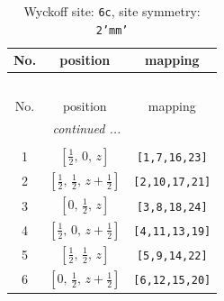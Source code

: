 \documentclass[fleqn,8pt]{jsarticle}
\begin{document}
\renewcommand{\arraystretch}{1.2}
\begin{longtable}{ccc}
\caption{Wyckoff site: {\tt 6c}, site symmetry: {\tt 2'mm'}}
 \\
 \hline \hline
No. & position & mapping \\ \hline \endfirsthead

\multicolumn{2}{l}{\tablename\ \thetable{}} \\
 \hline \hline
No. & position & mapping \\ \hline \endhead

 \hline \hline
\multicolumn{2}{r}{\footnotesize\it continued ...} \\ \endfoot

 \hline \hline
\multicolumn{2}{r}{} \\ \endlastfoot

1 & $\left[ \frac{1}{2},\, 0,\, z \right]$ & {\tt [1,7,16,23]} \\ \hline
2 & $\left[ \frac{1}{2},\, \frac{1}{2},\, z + \frac{1}{2} \right]$ & {\tt [2,10,17,21]} \\ \hline
3 & $\left[ 0,\, \frac{1}{2},\, z \right]$ & {\tt [3,8,18,24]} \\ \hline
4 & $\left[ \frac{1}{2},\, 0,\, z + \frac{1}{2} \right]$ & {\tt [4,11,13,19]} \\ \hline
5 & $\left[ \frac{1}{2},\, \frac{1}{2},\, z \right]$ & {\tt [5,9,14,22]} \\ \hline
6 & $\left[ 0,\, \frac{1}{2},\, z + \frac{1}{2} \right]$ & {\tt [6,12,15,20]} \\
\end{longtable}
\renewcommand{\arraystretch}{1.2}
\end{document}
